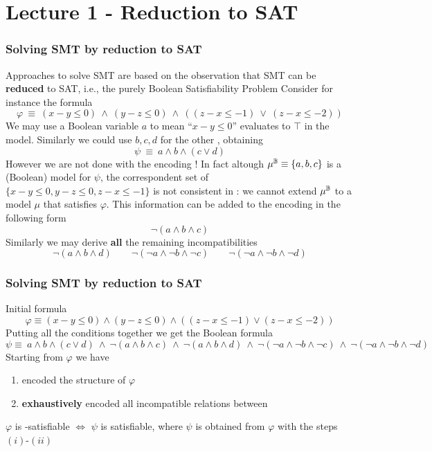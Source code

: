 \section{Lecture 1 - Reduction to SAT}

\begin{frame}
  \frametitle{Solving SMT \formulae by reduction to SAT}

  \scriptsize

  Approaches to solve SMT \formulae are based on the observation
  that SMT can be {\bf reduced} to SAT, i.e., the purely Boolean
  Satisfiability Problem
  \vfill
  Consider for instance the \Lia formula
  $$
  \varphi\ \equiv\ (x - y \leq 0)\ \wedge\ (y - z \leq 0)\ \wedge\ ((z - x \leq -1)\ \vee\ (z - x \leq -2))
  $$
  We may use a Boolean variable $a$ to mean ``$x - y \leq 0$'' evaluates to $\top$
  in the model. Similarly we could use $b, c, d$ for the other \tatoms, obtaining
  $$
  \psi\ \equiv\ a \wedge b \wedge (c \vee d)
  $$
  \vfill
  \pause
  However we are not done with the encoding ! In fact altough $\mu^\mathbb{B} \equiv \{ a, b, c \}$ 
  is a (Boolean) model for $\psi$, the correspondent set of \tatoms $\{ x - y \leq 0, y - z \leq 0, z - x \leq -1 \}$
  is not consistent in \Lia: we cannot extend $\mu^\mathbb{B}$ to a model $\mu$ that satisfies $\varphi$.
  \pause
  \vfill
  This information can be added to the encoding in the following form
  $$ \neg( a \wedge b \wedge c )$$
  \pause
  \vfill
  Similarly we may derive {\bf all} the remaining incompatibilities
  $$ \neg( a \wedge b \wedge d )\quad\quad \neg( \neg a \wedge \neg b \wedge \neg c )\quad\quad \neg( \neg a \wedge \neg b \wedge \neg d )$$

\end{frame}

\begin{frame}
  \frametitle{Solving SMT \formulae by reduction to SAT}

  \scriptsize

  Initial \Lia formula
  $$
  \varphi \equiv (x - y \leq 0) \wedge (y - z \leq 0) \wedge ((z - x \leq -1) \vee (z - x \leq -2))
  $$
  Putting all the conditions together we get the Boolean formula
  $$ 
  \psi \equiv\ a \wedge b \wedge (c \vee d)\ \wedge\ \neg( a \wedge b \wedge c )\ \wedge\ \neg( a \wedge b \wedge d )\ \wedge\
  \neg( \neg a \wedge \neg b \wedge \neg c )\ \wedge\ \neg( \neg a \wedge \neg b \wedge \neg d )
  $$ \pause
  \vfill
  Starting from $\varphi$ we have
  \begin{enumerate}[$(i)$]
    \item encoded the structure of $\varphi$
    \item {\bf exhaustively} encoded all incompatible relations between \tatoms 
  \end{enumerate} 
  \vfill
  \begin{theorem}
    $\varphi$ is \T-satisfiable $\Leftrightarrow$ $\psi$ is satisfiable,
    where $\psi$ is obtained from $\varphi$ with the steps $(i)$-$(ii)$
  \end{theorem}

\end{frame}

